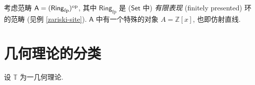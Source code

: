 

考虑范畴 $\mathsf A = (\mathsf {Ring}_{\text{fp}})^{\text{op}}$,
其中 $\mathsf {Ring}_{\text{fp}}$ 是 ($\mathsf{Set}$ 中) \emph{有限表现} (finitely presented) 环的范畴 (见例 \ref{zariski-site}).
$\mathsf A$ 中有一个特殊的对象 $A = \mathbb{Z}[x]$,
也即仿射直线.

\section{几何理论的分类\topos{}}

\begin{definition}
    {}
    设 $\mathbb T$ 为一几何理论.
    
\end{definition}